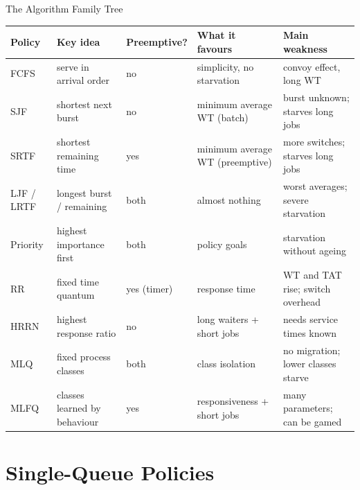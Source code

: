 \documentclass[aspectratio=169]{beamer}
\begin{document}
\begin{frame}{The Algorithm Family Tree}
  \centering
  \scriptsize
  \renewcommand{\arraystretch}{1.18}
  \setlength{\tabcolsep}{3pt}
  \begin{tabular}{p{1.25cm}p{2.95cm}p{1.65cm}p{2.4cm}p{2.95cm}}
    \toprule
    \textbf{Policy} & \textbf{Key idea} & \textbf{Preemptive?} &
    \textbf{What it favours} & \textbf{Main weakness} \\
    \midrule
    FCFS & serve in arrival order & no & simplicity, no starvation &
    convoy effect, long WT \\
    SJF & shortest next burst & no & minimum average WT (batch) &
    burst unknown; starves long jobs \\
    SRTF & shortest remaining time & yes & minimum average WT (preemptive) &
    more switches; starves long jobs \\
    LJF / LRTF & longest burst / remaining & both & almost nothing &
    worst averages; severe starvation \\
    Priority & highest importance first & both & policy goals &
    starvation without ageing \\
    RR & fixed time quantum & yes (timer) & response time &
    WT and TAT rise; switch overhead \\
    HRRN & highest response ratio & no & long waiters + short jobs &
    needs service times known \\
    MLQ & fixed process classes & both & class isolation &
    no migration; lower classes starve \\
    MLFQ & classes learned by behaviour & yes & responsiveness + short jobs &
    many parameters; can be gamed \\
    \bottomrule
  \end{tabular}
\end{frame}


\section{Single-Queue Policies}
\end{document}
